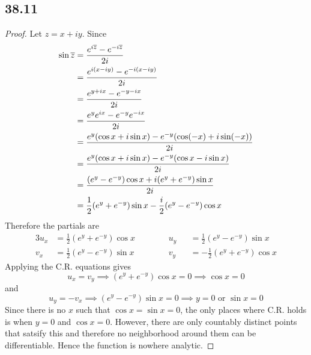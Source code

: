 \documentclass[12pt,titlepage]{extarticle}
\begin{document}
\subsection*{38.11}
\begin{proof}
    Let $z = x + iy$. Since
    \begin{align*}
        \sin \overline{z} &= \frac{e^{i \overline{z}} - e^{- i \overline{z}}}{2i} \\
                      &= \frac{e^{i(x - iy)} - e^{-i(x - iy)}}{2i} \\
                      &= \frac{e^{y + ix} - e^{-y - ix}}{2i} \\
                      &= \frac{e^{y} e^{ix} - e^{-y} e^{-ix}}{2i} \\
                      &= \frac{e^{y} (\cos x + i \sin x) - e^{-y} (\cos(-x) + i \sin(-x))}{2i} \\
                      &= \frac{e^{y} (\cos x + i \sin x) - e^{-y} (\cos x - i \sin x)}{2i} \\
                      &= \frac{(e^y - e^{-y})\cos x  + i (e^y + e^{-y}) \sin x }{2i} \\
                      &= \frac{1}{2} (e^y + e^{-y}) \sin x - \frac{i}{2} (e^y - e^{-y}) \cos x
    \end{align*}
    Therefore the partials are
    \begin{alignat*}{3}
        u_x &= \frac{1}{2} (e^y + e^{-y}) \cos x \hspace{1cm} && u_y &&= \frac{1}{2} (e^y - e^{-y}) \sin x \\
        v_x &= \frac{1}{2} (e^y - e^{-y}) \sin x && v_y &&= -\frac{1}{2} (e^y + e^{-y}) \cos x
    \end{alignat*}
    Applying the C.R. equations gives
    \[
        u_x = v_y \implies (e^y + e^{-y}) \cos x = 0 \implies \cos x = 0
    \]
    and
    \[
        u_y = -v_x \implies (e^y - e^{-y}) \sin x = 0 \implies y = 0 \text{ or } \sin x = 0
    \]
    Since there is no $x$ such that $\cos x = \sin x = 0$, the only places where C.R. holds is when $y = 0$ and $\cos x = 0$. However, there are only countably distinct points that satsify this and therefore no neighborhood around them can be differentiable. Hence the function is nowhere analytic.
\end{proof}
\end{document}
